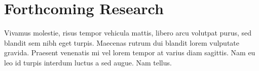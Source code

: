 
\section*{Forthcoming Research}

Vivamus molestie, risus tempor vehicula mattis, libero arcu volutpat purus, sed blandit sem nibh eget turpis. Maecenas rutrum dui blandit lorem vulputate gravida. Praesent venenatis mi vel lorem tempor at varius diam sagittis. Nam eu leo id turpis interdum luctus a sed augue. Nam tellus.